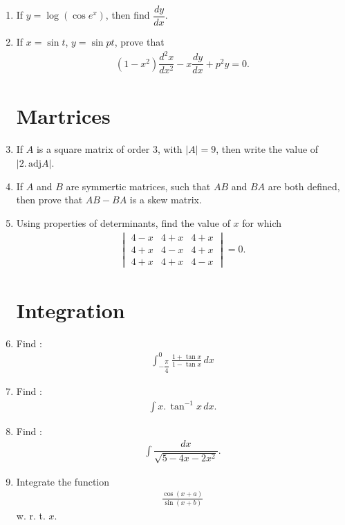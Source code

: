 \documentclass[12pt,-letter paper]{article}
\providecommand{\mydet}[1]{\ensuremath{\begin{vmatrix}#1\end{vmatrix}}}
\providecommand{\brak}[1]{\ensuremath{\left(#1\right)}}
\providecommand{\abs}[1]{\left\vert#1\right\vert}
\begin{document}
\begin{enumerate}
    \item If $y=\log(\cos{e^x})$, then find $\dfrac{dy}{dx}$.

    \item If $x = \sin{t}$, $y = \sin{pt}$, prove that
    \begin{align*}
    \brak{1-x^{2}}\dfrac{d^{2}x}{dx^{2}}-x\dfrac{dy}{dx}+p^{2}y=0.
    \end{align*}
 
\section{Martrices}
     \item If $A$ is a square matrix of order $3$, with $\abs{A} = 9$, then write the value of $\abs{2.\,\text{adj}A}$.

     \item If $A$ and $B$ are symmertic matrices, such that $AB$ and $BA$ are both defined, then prove that $AB-BA$ is a skew matrix.

    \item Using properties of determinants, find the value of $x$ for which
    \begin{align*}
        \mydet{4-x&4+x&4+x\\4+x&4-x&4+x\\4+x&4+x&4-x}=0.
    \end{align*}
    
\section{Integration}
     \item Find :
        \begin{align*}
         \int_{-\dfrac{\pi}{4}}^{0}  \frac{1+\tan{x}}{1- \tan{x}} \,dx
        \end{align*}

     \item Find :
        \begin{align*}
            \int x.\,\tan^{-1}{x} \,dx.
        \end{align*}

    \item Find :
        \begin{align*}
            \int \dfrac{dx}{\sqrt{5-4x-2x^2}}.
        \end{align*}

    \item Integrate the function
    \begin{align*}
    \frac{\cos{\brak{x+a}}}{\sin{\brak{x+b}}}
    \end{align*}
    w. r. t. $x$.


\end{enumerate}
\end{document}
